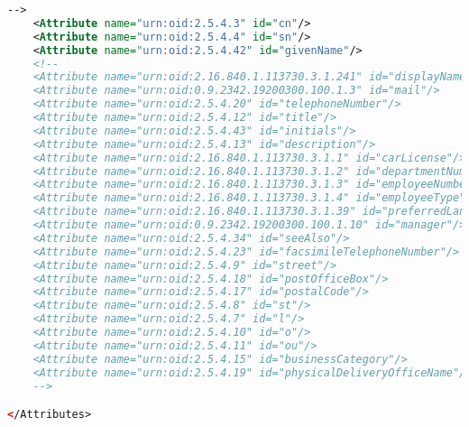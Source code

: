 \begin{lstlisting}[language=xml]
    -->
    <Attribute name="urn:oid:2.5.4.3" id="cn"/>
    <Attribute name="urn:oid:2.5.4.4" id="sn"/>
    <Attribute name="urn:oid:2.5.4.42" id="givenName"/>
    <!--
    <Attribute name="urn:oid:2.16.840.1.113730.3.1.241" id="displayName"/>
    <Attribute name="urn:oid:0.9.2342.19200300.100.1.3" id="mail"/>
    <Attribute name="urn:oid:2.5.4.20" id="telephoneNumber"/>
    <Attribute name="urn:oid:2.5.4.12" id="title"/>
    <Attribute name="urn:oid:2.5.4.43" id="initials"/>
    <Attribute name="urn:oid:2.5.4.13" id="description"/>
    <Attribute name="urn:oid:2.16.840.1.113730.3.1.1" id="carLicense"/>
    <Attribute name="urn:oid:2.16.840.1.113730.3.1.2" id="departmentNumber"/>
    <Attribute name="urn:oid:2.16.840.1.113730.3.1.3" id="employeeNumber"/>
    <Attribute name="urn:oid:2.16.840.1.113730.3.1.4" id="employeeType"/>
    <Attribute name="urn:oid:2.16.840.1.113730.3.1.39" id="preferredLanguage"/>
    <Attribute name="urn:oid:0.9.2342.19200300.100.1.10" id="manager"/>
    <Attribute name="urn:oid:2.5.4.34" id="seeAlso"/>
    <Attribute name="urn:oid:2.5.4.23" id="facsimileTelephoneNumber"/>
    <Attribute name="urn:oid:2.5.4.9" id="street"/>
    <Attribute name="urn:oid:2.5.4.18" id="postOfficeBox"/>
    <Attribute name="urn:oid:2.5.4.17" id="postalCode"/>
    <Attribute name="urn:oid:2.5.4.8" id="st"/>
    <Attribute name="urn:oid:2.5.4.7" id="l"/>
    <Attribute name="urn:oid:2.5.4.10" id="o"/>
    <Attribute name="urn:oid:2.5.4.11" id="ou"/>
    <Attribute name="urn:oid:2.5.4.15" id="businessCategory"/>
    <Attribute name="urn:oid:2.5.4.19" id="physicalDeliveryOfficeName"/>
    -->

</Attributes>
\end{lstlisting}
